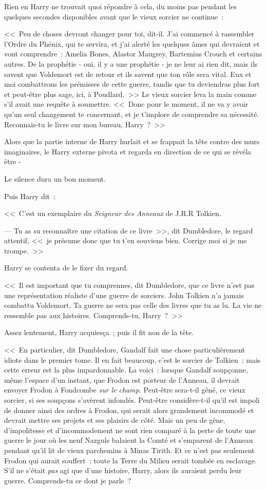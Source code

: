 Rien en Harry ne trouvait quoi répondre à cela, du moins pas pendant les quelques secondes disponibles avant que le vieux sorcier ne continue~:

<<~Peu de choses devront changer pour toi, dit-il. J'ai commencé à rassembler l'Ordre du Phénix, qui te servira, et j'ai alerté les quelques âmes qui devraient et vont comprendre~: Amelia Bones, Alastor Maugrey, Bartemius Crouch et certains autres. De la prophétie - oui, il y a une prophétie - je ne leur ai rien dit, mais ils savent que Voldemort est de retour et ils savent que ton rôle sera vital. Eux et moi combattrons les prémisses de cette guerre, tandis que tu deviendras plus fort et peut-être plus sage, ici, à Poudlard.~>> Le vieux sorcier leva la main comme s'il avait une requête à soumettre. <<~Donc pour le moment, il ne va y avoir qu'un seul changement te concernant, et je t'implore de comprendre sa nécessité. Reconnais-tu le livre sur mon bureau, Harry~?~>>

Alors que la partie interne de Harry hurlait et se frappait la tête contre des murs imaginaires, le Harry externe pivota et regarda en direction de ce qui se révéla être -

Le silence dura un bon moment.

Puis Harry dit~:

<<~C'est un exemplaire du \emph{Seigneur des Anneaux} de J.R.R Tolkien.

--- Tu as su reconnaître une citation de ce livre~>>, dit Dumbledore, le regard attentif, <<~je présume donc que tu t'en souviens bien. Corrige moi si je me trompe.~>>

Harry se contenta de le fixer du regard.

<<~Il est important que tu comprennes, dit Dumbledore, que ce livre n'est pas une représentation réaliste d'une guerre de sorciers. John Tolkien n'a jamais combattu Voldemort. Ta guerre ne sera pas celle des livres que tu as lu. La vie ne ressemble pas aux histoires. Comprends-tu, Harry~?~>>

Assez lentement, Harry acquiesça~; puis il fit non de la tête.

<<~En particulier, dit Dumbledore, Gandalf fait une chose particulièrement idiote dans le premier tome. Il en fait beaucoup, c'est le sorcier de Tolkien~; mais cette erreur est la plus impardonnable. La voici~: lorsque Gandalf soupçonne, même l'espace d'un instant, que Frodon est porteur de l'Anneau, il devrait envoyer Frodon à Fondcombe \emph{sur le champ}. Peut-être sera-t-il gêné, ce vieux sorcier, si ses soupçons s'avèrent infondés. Peut-être considère-t-il qu'il est impoli de donner ainsi des ordres à Frodon, qui serait alors grandement incommodé et devrait mettre ses projets et ses plaisirs de côté. Mais un peu de gêne, d'impolitesse et d'incommodement ne sont rien comparé à la perte de toute une guerre le jour où les neuf Nazguls balaient la Comté et s'emparent de l'Anneau pendant qu'il lit de vieux parchemins à Minas Tirith. Et ce n'est pas seulement Frodon qui aurait souffert~; toute la Terre du Milieu serait tombée en esclavage. S'il ne s'était \emph{pas} agi que d'une histoire, Harry, alors ils auraient perdu leur guerre. Comprends-tu ce dont je parle~?

